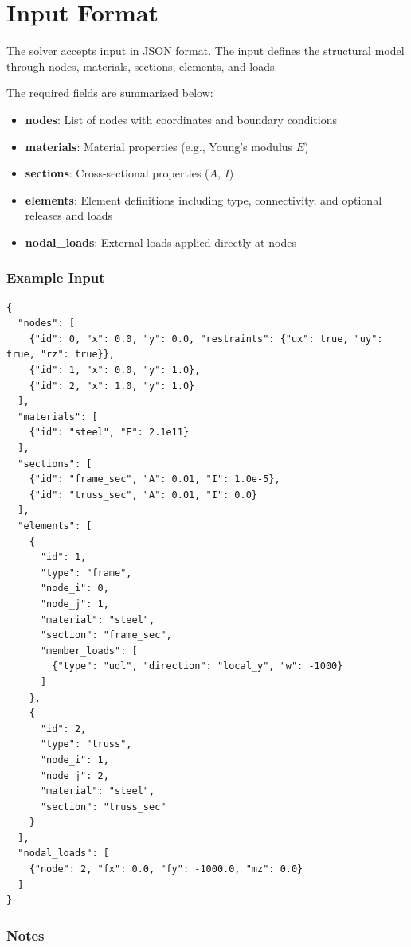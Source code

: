 \section{Input Format}

The solver accepts input in JSON format. The input defines the structural model through nodes, materials, sections, elements, and loads.

The required fields are summarized below:

\begin{itemize}
    \item \textbf{nodes}: List of nodes with coordinates and boundary conditions
    \item \textbf{materials}: Material properties (e.g., Young's modulus $E$)
    \item \textbf{sections}: Cross-sectional properties ($A$, $I$)
    \item \textbf{elements}: Element definitions including type, connectivity, and optional releases and loads
    \item \textbf{nodal\_loads}: External loads applied directly at nodes
\end{itemize}

\subsubsection*{Example Input}

\begin{verbatim}
{
  "nodes": [
    {"id": 0, "x": 0.0, "y": 0.0, "restraints": {"ux": true, "uy": true, "rz": true}},
    {"id": 1, "x": 0.0, "y": 1.0},
    {"id": 2, "x": 1.0, "y": 1.0}
  ],
  "materials": [
    {"id": "steel", "E": 2.1e11}
  ],
  "sections": [
    {"id": "frame_sec", "A": 0.01, "I": 1.0e-5},
    {"id": "truss_sec", "A": 0.01, "I": 0.0}
  ],
  "elements": [
    {
      "id": 1,
      "type": "frame",
      "node_i": 0,
      "node_j": 1,
      "material": "steel",
      "section": "frame_sec",
      "member_loads": [
        {"type": "udl", "direction": "local_y", "w": -1000}
      ]
    },
    {
      "id": 2,
      "type": "truss",
      "node_i": 1,
      "node_j": 2,
      "material": "steel",
      "section": "truss_sec"
    }
  ],
  "nodal_loads": [
    {"node": 2, "fx": 0.0, "fy": -1000.0, "mz": 0.0}
  ]
}
\end{verbatim}

\subsubsection*{Notes}

